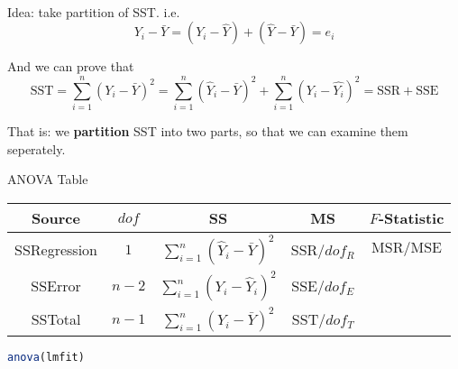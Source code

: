 \\



    Idea: take partition of SST. i.e.
    \begin{equation}
        Y_i-\bar{Y}=(Y_i-\hat{Y})+(\hat{Y}-\bar{Y})=e_i 
    \end{equation}
    
    And we can prove that
    \begin{equation}
        \mathrm{SST}=\sum_{i=1}^n(Y_i-\bar{Y})^2=\sum_{i=1}^n(\hat{Y}_i-\bar{Y})^2+\sum_{i=1}^n(Y_i-\hat{Y_i})^2=\mathrm{SSR+SSE} 
    \end{equation}

    That is: we \textbf{partition} SST into two parts, so that we can examine them seperately.
    

    \begin{point}
        ANOVA Table
    \end{point}
    
        \begin{table}[H]
            \centering
            \renewcommand\arraystretch{1}
            \begin{tabular}{c|cccc}
                \hline
                Source&$ dof $&SS&MS&$ F $-Statistic\\\hline
                SSRegression&$ 1 $&$ \sum_{i=1}^n(\hat{Y}_i-\bar{Y})^2  $&SSR/$ dof_R $& $ \mathrm{MSR}/\mathrm{MSE} $\\
                SSError&$ n-2 $&$ \sum_{i=1}^n(Y_i-\hat{Y}_i)^2  $&SSE/$ dof_E $& \\
                SSTotal&$ n-1 $&$ \sum_{i=1}^n(Y_i-\bar{Y})^2  $&SST/$ dof_T $& \\
                \hline
            \end{tabular}
        \end{table}
    \begin{rcode}
        \begin{lstlisting}[language=R]
    anova(lmfit)
        \end{lstlisting}
    \end{rcode}    





